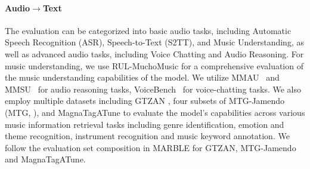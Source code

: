 
\paragraph{Audio$\to$Text} The evaluation can be categorized into basic audio tasks, including Automatic Speech Recognition (ASR), Speech-to-Text (S2TT), and Music Understanding, as well as advanced audio tasks, including Voice Chatting and Audio Reasoning.
For music understanding, we use RUL-MuchoMusic \citep{zang2025you} for a comprehensive evaluation of the music understanding capabilities of the model.
We utilize MMAU~\citep{sakshi2024mmaumassivemultitaskaudio} and MMSU~\citep{mmsu} for audio reasoning tasks, VoiceBench~\citep{chen2024voicebench} for voice-chatting tasks. We also employ multiple datasets including GTZAN \citep{tzanetakis2002musical}, four subsets of MTG-Jamendo (MTG, \cite{bogdanov2019mtg}), and MagnaTagATune \citep{law2009evaluation} to evaluate the model's capabilities across various music information retrieval tasks including genre identification, emotion and theme recognition, instrument recognition and music keyword annotation. We follow the evaluation set composition in MARBLE \citep{yuan2023marble} for GTZAN, MTG-Jamendo and MagnaTagATune.


